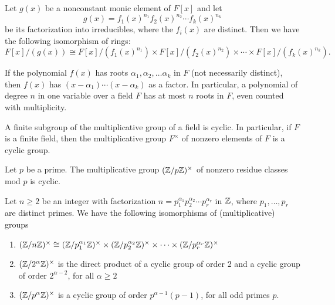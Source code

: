 \documentclass[../main]{subfiles}
\begin{document}
\begin{prop}
 Let $g(x)$ be a nonconstant monic element of $F[x]$ and let 
 \[ g(x) = f_1(x)^{n_1} f_2(x)^{n_2} \cdots f_k(x)^{n_k} \]
 be its factorization into irreducibles, where the $f_i(x)$ are distinct. Then we have the following isomorphism of rings:
 \[ F[x]/(g(x)) \cong F[x]/(f_1(x)^{n_1}) \times F[x]/(f_2(x)^{n_2}) \times \cdots \times F[x]/(f_k(x)^{n_k}). \]
\end{prop}


\begin{prop}
 If the polynomial $f(x)$ has roots $\alpha_1, \alpha_2, \ldots \alpha_k$ in $F$ (not necessarily distinct), then $f(x)$ has $(x-\alpha_1) \cdots (x-\alpha_k)$ as a factor. In particular, a polynomial of degree $n$ in one variable over a field $F$ has at most $n$ roots in $F$, even counted with multiplicity.
\end{prop}


\begin{prop}
 A finite subgroup of the multiplicative group of a field is cyclic. In particular, if $F$ is a finite field, then the multiplicative group $F^\times$ of nonzero elements of $F$ is a cyclic group.
\end{prop}


\begin{cor}
 Let $p$ be a prime. The multiplicative group $(\mathbb{Z}/p\mathbb{Z})^\times$ of nonzero residue classes mod $p$ is cyclic.
\end{cor}


\begin{cor}
 Let $n\geq 2$ be an integer with factorization $n = p_1^{\alpha_1} p_2^{\alpha_2} \cdots p_r^{\alpha_r}$ in $\mathbb{Z}$, where $p_1, \ldots, p_r$ are distinct primes. We have the following isomorphisms of (multiplicative) groups
 \begin{enumerate}
  \item $(\mathbb{Z}/n\mathbb{Z})^\times \cong (\mathbb{Z}/p_1^{\alpha_1}\mathbb{Z})^\times \times (\mathbb{Z}/p_2^{\alpha_2}\mathbb{Z})^\times \times \cdots \times (\mathbb{Z}/p_r^{\alpha_r}\mathbb{Z})^\times$
  
  \item $(\mathbb{Z}/2^\alpha \mathbb{Z})^\times$ is the direct product of a cyclic group of order 2 and a cyclic group of order $2^{\alpha - 2}$, for all $\alpha \geq 2$
  
  \item $(\mathbb{Z}/p^\alpha \mathbb{Z})^\times$ is a cyclic group of order $p^{\alpha - 1}(p-1)$, for all odd primes $p$.
 \end{enumerate}
\end{cor}
\end{document}
